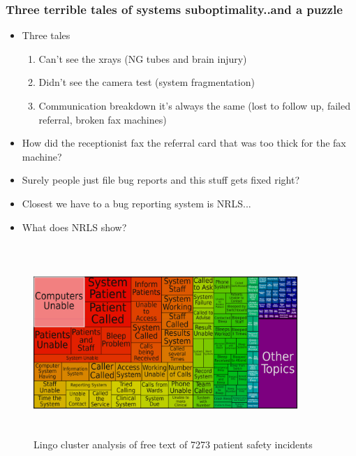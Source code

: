 \documentclass[handout, red]{beamer}
\begin{document}
\begin{frame}
  \frametitle{Three terrible tales of systems suboptimality..and a puzzle}   %

  
  
 \begin{itemize}
 
 \item Three tales
 
 \begin{enumerate}
  \item Can't see the xrays (NG tubes and brain injury)
  
  \item Didn't see the camera test (system fragmentation)
  
  \item Communication breakdown it's always the same (lost to follow up, failed referral, broken fax machines)
  \end{enumerate}
  
 
   \item How did the receptionist fax the referral card that was too thick for the fax machine?
  \end{itemize}

\end{frame}

\begin{frame}
\begin{itemize}
  \item Surely people just file bug reports and this stuff gets fixed right?
  \item Closest we have to a bug reporting system is NRLS...
  \item What does NRLS show?
 \end{itemize}
\end{frame}	

\begin{frame}
  \frametitle{}   %
  
\begin{figure}[htp]
\centering
\includegraphics[width=10cm,height=7cm]{figs/lingoclustering.png}
\caption{Lingo cluster analysis of free text of 7273 patient safety incidents }\label{fig:bugsa}
\end{figure}
\end{frame}
\end{document}
